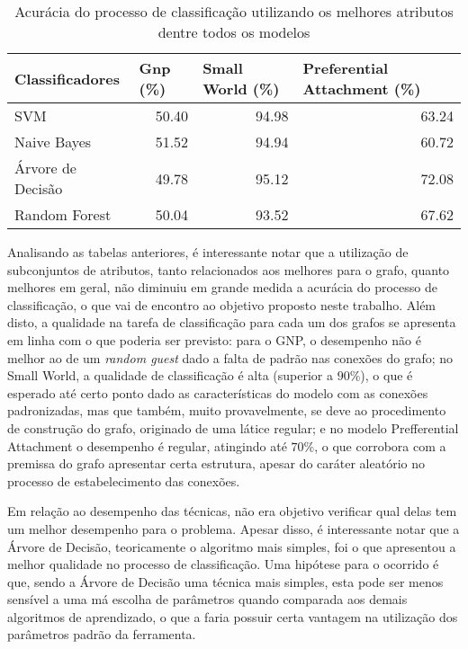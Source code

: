 \documentclass[a4paper,11pt]{article}
\begin{document}
\begin{table}[!h]
\caption{Acurácia do processo de classificação utilizando os melhores atributos dentre todos os modelos}
\center
\begin{tabular}{|l|r|r|r|}
\hline
Classificadores & \multicolumn{1}{l|}{Gnp (\%)} & \multicolumn{1}{l|}{Small World (\%)} & \multicolumn{1}{l|}{Preferential Attachment (\%)} \\ \hline \hline
SVM & 50.40 & 94.98 & 63.24 \\ \hline
Naive Bayes & 51.52 & 94.94 & 60.72 \\ \hline
Árvore de Decisão & 49.78 & 95.12 & 72.08 \\ \hline
Random Forest & 50.04 & 93.52 & 67.62 \\ \hline
\end{tabular}
\label{tab:acctopall}
\end{table}

\newpage

Analisando as tabelas anteriores, é interessante notar que a utilização de subconjuntos de atributos, tanto relacionados aos melhores para o grafo, quanto melhores em geral, não diminuiu em grande medida a acurácia do processo de classificação, o que vai de encontro ao objetivo proposto neste trabalho. Além disto, a qualidade na tarefa de classificação para cada um dos grafos se apresenta em linha com o que poderia ser previsto: para o GNP, o desempenho não é melhor ao de um \textit{random guest} dado a falta de padrão nas conexões do grafo; no Small World, a qualidade de classificação é alta (superior a $90\%$), o que é esperado até certo ponto dado as características do modelo com as conexões padronizadas, mas que também, muito provavelmente, se deve ao procedimento de construção do grafo, originado de uma látice regular; e no modelo Prefferential Attachment o desempenho é regular, atingindo até $70\%$, o que corrobora com a premissa do grafo apresentar certa estrutura, apesar do caráter aleatório no processo de estabelecimento das conexões.

Em relação ao desempenho das técnicas, não era objetivo verificar qual delas tem um melhor desempenho para o problema. Apesar disso, é interessante notar que a Árvore de Decisão, teoricamente o algoritmo mais simples, foi o que apresentou a melhor qualidade no processo de classificação. Uma hipótese para o ocorrido é que, sendo a Árvore de Decisão uma técnica mais simples, esta pode ser menos sensível a uma má escolha de parâmetros quando comparada aos demais algoritmos de aprendizado, o que a faria possuir certa vantagem na utilização dos parâmetros padrão da ferramenta.
\end{document}
